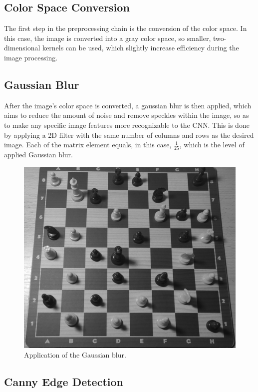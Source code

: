 \documentclass[10pt]{article}
\begin{document}
\subsection{Color Space Conversion}

The first step in the preprocessing chain is the conversion of the color space. In this case, the image is converted into a gray color space, so smaller, two-dimensional kernels can be used, which slightly increase efficiency during the image processing.

\subsection{Gaussian Blur}

After the image's color space is converted, a gaussian blur is then applied, which aims to reduce the amount of noise and remove speckles within the image, so as to make any specific image features more recognizable to the CNN. This is done by applying a 2D filter with the same number of columns and rows as the desired image. Each of the matrix element equals, in this case, $\frac{1}{25}$, which is the level of applied Gaussian blur.

\begin{figure}[H]
	\centering
	\includegraphics[scale=0.15]{gaussian-blur}
	\caption{Application of the Gaussian blur.}\label{fig:gaussian-blur}
\end{figure}

\subsection{Canny Edge Detection}
\end{document}

